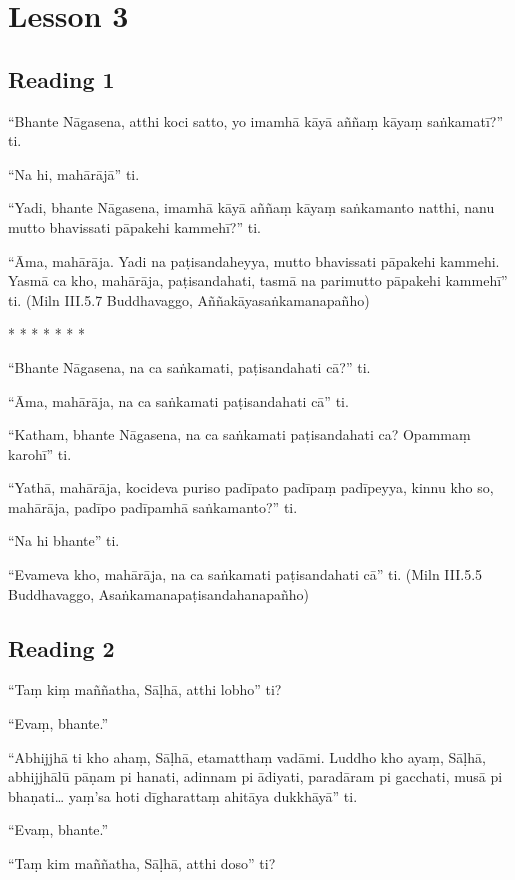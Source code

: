 \chapter{Lesson 3}

\section*{Reading 1}

“Bhante Nāgasena, atthi koci satto, yo imamhā kāyā aññaṃ kāyaṃ saṅkamatī?” ti.

“Na hi, mahārājā” ti.

“Yadi, bhante Nāgasena, imamhā kāyā aññaṃ kāyaṃ saṅkamanto natthi, nanu mutto bhavissati pāpakehi kammehī?” ti.

“Āma, mahārāja. Yadi na paṭisandaheyya, mutto bhavissati pāpakehi kammehi. Yasmā ca kho, mahārāja, paṭisandahati, tasmā na parimutto pāpakehi kammehī” ti. \hfill(Miln III.5.7 Buddhavaggo, Aññakāyasaṅkamanapañho)

\begin{center}
    * * * * * * *
\end{center}

“Bhante Nāgasena, na ca saṅkamati, paṭisandahati cā?” ti.

“Āma, mahārāja, na ca saṅkamati paṭisandahati cā” ti.

“Katham, bhante Nāgasena, na ca saṅkamati paṭisandahati ca? Opammaṃ karohī” ti.

“Yathā, mahārāja, kocideva puriso padīpato padīpaṃ padīpeyya, kinnu kho so, mahārāja, padīpo padīpamhā saṅkamanto?” ti.

“Na hi bhante” ti.

“Evameva kho, mahārāja, na ca saṅkamati paṭisandahati cā” ti. \hfill(Miln III.5.5 Buddhavaggo, Asaṅkamanapaṭisandahanapañho)

\section*{Reading 2}

“Taṃ kiṃ maññatha, Sāḷhā, atthi lobho” ti?

“Evaṃ, bhante.”

“Abhijjhā ti kho ahaṃ, Sāḷhā, etamatthaṃ vadāmi. Luddho kho ayaṃ, Sāḷhā, abhijjhālū pāṇam pi hanati, adinnam pi ādiyati, paradāram pi gacchati, musā pi bhaṇati… yaṃ’sa hoti dīgharattaṃ ahitāya dukkhāyā” ti.

“Evaṃ, bhante.”

“Taṃ kim maññatha, Sāḷhā, atthi doso” ti?

